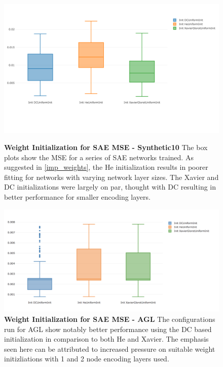 \documentclass[a4paper,latin]{paper}
\begin{document}
\begin{figure}[H]
	\centering
	\begin{minipage}{0.45\textwidth}
		\centering 
		\includegraphics[scale=0.3]{images/iteration_four/it4_sae_init.png}
		\caption{\textbf{Weight Initialization for SAE MSE - Synthetic10}
			\newline The box plots show the MSE for a series of SAE networks trained. As suggested in \ref{imp_weights}, the He initialization results in poorer fitting for networks with varying network layer sizes. The Xavier and DC initializations were largely on par, thought with DC resulting in better performance for smaller encoding layers.}
		\label{figure-results_it4_sae_init}
	\end{minipage}\hfill
	\begin{minipage}{0.45\textwidth}
		\centering \includegraphics[scale=0.3]{images/iteration_five/it5_sae_init_agl.png}
		\caption{\textbf{Weight Initialization for SAE MSE - AGL} 
			\newline The configurations run for AGL show notably better performance using the DC based initialization in comparison to both He and Xavier. The emphasis seen here can be attributed to increased pressure on suitable weight initizliations with 1 and 2 node encoding layers used.}
		\label{figure-results_it5_sae_init}
	\end{minipage}
\end{figure}
\end{document}
